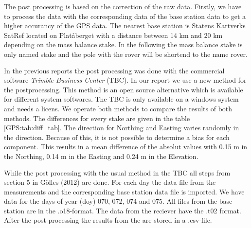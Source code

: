 
The post processing is based on the correction of the raw data.
Firstly, we have to process the data with the corresponding data of the base station data to get a higher accurancy of the GPS data.
The nearest base station is Statens Kartverks SatRef located on Platåberget with a distance between 14 km and 20 km depending on the mass balance stake.
In the following the mass balance stake is only named stake and the pole with the rover will be shortend to the name rover.
\medskip

In the previous reports the post processing was done with the commercial software \textit{Trimble Business Center} (TBC). 
In our report we use a new method for the postprocessing. 
This method is an open source alternative which is available for different system softwares. 
The TBC is only available on a windows system and needs a licens. 
We operate both methods to compare the results of both methods.
The differences for every stake are given in the table \ref{GPS:tab:diff_tab}.
The direction for Northing and Easting varies randomly in the direction.
Because of this, it is not possible to determine a bias for each component.
This results in a mean difference of the absolut values with 0.15 m in the Northing, 0.14 m in the Easting and 0.24 m in the Elevation.
\medskip

While the post processing with the usual method in the TBC all steps from section 5 in Gölles (2012) are done.
For each day the data file from the measurements and the corresponding base station data file is imported. 
We have data for the days of year (doy) 070, 072, 074 and 075.
All files from the base station are in the .o18-format. 
The data from the reciever have the .t02 format. 
After the post processing the results from the are stored in a .csv-file.
\medskip

